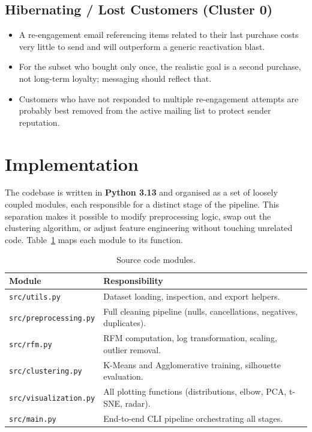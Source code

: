 \documentclass[12pt, a4paper]{article}
\begin{document}
\subsection{Hibernating / Lost Customers (Cluster 0)}
\begin{itemize}[nosep]
    \item A re-engagement email referencing items related to their last purchase costs very little to send and will outperform a generic reactivation blast.
    \item For the subset who bought only once, the realistic goal is a second purchase, not long-term loyalty; messaging should reflect that.
    \item Customers who have not responded to multiple re-engagement attempts are probably best removed from the active mailing list to protect sender reputation.
\end{itemize}

\section{Implementation}\label{sec:implementation}

The codebase is written in \textbf{Python 3.13} and organised as a set of loosely coupled modules, each responsible for a distinct stage of the pipeline. This separation makes it possible to modify preprocessing logic, swap out the clustering algorithm, or adjust feature engineering without touching unrelated code. Table~\ref{tab:modules} maps each module to its function.

\begin{table}[H]
\centering
\caption{Source code modules.}
\label{tab:modules}
\begin{tabular}{@{}lp{9cm}@{}}
\toprule
\textbf{Module} & \textbf{Responsibility} \\
\midrule
\texttt{src/utils.py}          & Dataset loading, inspection, and export helpers. \\
\texttt{src/preprocessing.py}  & Full cleaning pipeline (nulls, cancellations, negatives, duplicates). \\
\texttt{src/rfm.py}            & RFM computation, log transformation, scaling, outlier removal. \\
\texttt{src/clustering.py}     & K-Means and Agglomerative training, silhouette evaluation. \\
\texttt{src/visualization.py}  & All plotting functions (distributions, elbow, PCA, t-SNE, radar). \\
\texttt{src/main.py}           & End-to-end CLI pipeline orchestrating all stages. \\
\bottomrule
\end{tabular}
\end{table}
\end{document}
